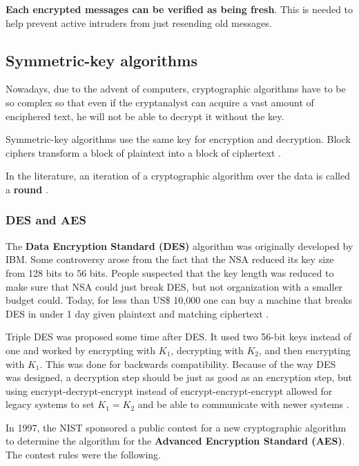 \textbf{Each encrypted messages can be verified as being fresh}. This is needed to help prevent active intruders from just resending old messages.

\subsection{Symmetric-key algorithms}

Nowadays, due to the advent of computers, cryptographic algorithms have to be so complex so that even if the cryptanalyst can acquire a vast amount of enciphered text, he will not be able to decrypt it without the key.

Symmetric-key algorithms use the same key for encryption and decryption. Block ciphers transform a block of plaintext into a block of ciphertext \cite[p.~779]{computer-networks-tanenbaum-2012}.

In the literature, an iteration of a cryptographic algorithm over the data is called a \textbf{round} \cite[p.~780]{computer-networks-tanenbaum-2012}.

\subsubsection{DES and AES}

The \textbf{Data Encryption Standard (DES)} algorithm was originally developed by IBM.
Some controversy arose from the fact that the NSA reduced its key size from 128 bits to 56 bits.
People suspected that the key length was reduced to make sure that NSA could just break DES, but not organization with a smaller budget could.
Today, for less than US\$ 10,000 one can buy a machine that breaks DES in under 1 day given plaintext and matching ciphertext \cite[p.~782]{computer-networks-tanenbaum-2012}.

Triple DES was proposed some time after DES. It used two 56-bit keys instead of one and worked by encrypting with \(K_1\), decrypting with \(K_2\), and then encrypting with \(K_1\).
This was done for backwards compatibility.
Because of the way DES was designed, a decryption step should be just as good as an encryption step, but using encrypt-decrypt-encrypt instead of encrypt-encrypt-encrypt allowed for legacy systems to set \(K_1 = K_2\) and be able to communicate with newer systems \cite[p.~783]{computer-networks-tanenbaum-2012}.

In 1997, the NIST sponsored a public contest for a new cryptographic algorithm to determine the algorithm for the \textbf{Advanced Encryption Standard (AES)}.
The contest rules were the following.

